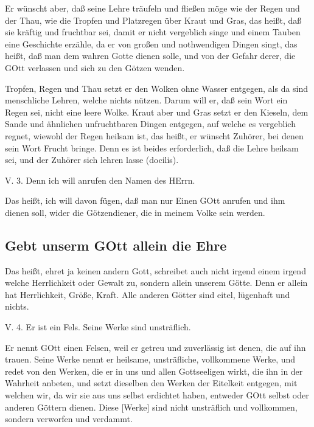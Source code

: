 Er wünscht aber, daß seine Lehre träufeln und fließen möge wie der Regen und der Thau, wie die Tropfen und Platzregen über Kraut und Gras, das heißt, daß sie kräftig und fruchtbar sei, damit er nicht vergeblich singe und einem Tauben eine Geschichte erzähle, da er von großen und nothwendigen Dingen singt, das heißt, daß man dem wahren Gotte dienen solle, und von der Gefahr derer, die GOtt verlassen und sich zu den Götzen wenden.

Tropfen, Regen und Thau setzt er den Wolken ohne Wasser entgegen, als da sind menschliche Lehren, welche nichts nützen. Darum will er, daß sein Wort ein Regen sei, nicht eine leere Wolke. Kraut aber und Gras setzt er den Kieseln, dem Sande und ähnlichen unfruchtbaren Dingen entgegen, auf welche es vergeblich regnet, wiewohl der Regen heilsam ist, das heißt, er wünscht Zuhörer, bei denen sein Wort Frucht bringe. Denn es ist beides erforderlich, daß die Lehre heilsam sei, und der Zuhörer sich lehren lasse (docilis).

\begin{schriftzitat}
V. 3. Denn ich will anrufen den Namen des HErrn.
\end{schriftzitat}

Das heißt, ich will davon fügen, daß man nur Einen GOtt anrufen und ihm dienen soll, wider die Götzendiener, die in meinem Volke sein werden.

\subsection{Gebt unserm GOtt allein die Ehre}

Das heißt, ehret ja keinen andern Gott, schreibet auch nicht irgend einem irgend welche Herrlichkeit oder Gewalt zu, sondern allein unserem
Götte. Denn er allein hat Herrlichkeit, Größe, Kraft. Alle anderen Götter sind eitel, lügenhaft und nichts.

\begin{schriftzitat}
V. 4. Er ist ein Fels. Seine Werke sind unsträflich.
\end{schriftzitat}

Er nennt GOtt einen Felsen, weil er getreu und zuverlässig ist denen, die auf ihn trauen. Seine Werke nennt er heilsame, unsträfliche, vollkommene Werke, und redet von den Werken, die er in uns und allen Gottseeligen wirkt, die ihn in der Wahrheit anbeten, und setzt dieselben den Werken der Eitelkeit entgegen, mit welchen wir, da wir sie aus uns selbst erdichtet haben, entweder GOtt selbst oder anderen Göttern dienen. Diese [Werke] sind nicht unsträflich und vollkommen, sondern verworfen und verdammt.

